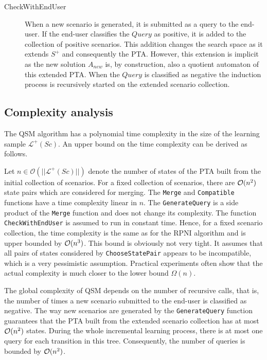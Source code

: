 \begin{description}
\item[CheckWithEndUser] When a new scenario is generated, it is submitted as a query to the end-user. If the end-user classifies the $Query$ as positive, it is added to the collection of positive scenarios. This addition changes the search space as it extends $S^+$ and consequently the PTA. However, this extension is implicit as the new solution $A_{new}$ is, by construction, also a quotient automaton of this extended PTA. When the $Query$ is classified as negative the induction process is recursively started on the extended scenario collection.

\end{description}

\subsection{Complexity analysis}

The QSM algorithm has a polynomial time complexity in the size of the learning sample $\mathcal{L}^+(Sc)$. An upper bound on the time complexity can be derived as follows.

Let $n\in \mathcal{O}(|| \mathcal{L}^+(Sc) ||)$ denote the number of states of the PTA built from the initial collection of scenarios. For a fixed collection of scenarios, there are ${\cal O}(n^2)$ state pairs which are considered for merging. The \texttt{Merge} and \texttt{Compatible} functions have a time complexity linear in $n$. The \texttt{GenerateQuery} is a side product of the \texttt{Merge} function and does not change its complexity. The function \texttt{CheckWithEndUser} is assumed to run in constant time. Hence, for a fixed scenario collection, the time complexity is the same as for the RPNI algorithm and is upper bounded by ${\cal O}(n^3)$. This bound is obviously not very tight. It assumes that all pairs of states considered by \texttt{ChooseStatePair} appears to be incompatible, which is a very pessimistic assumption. Practical experiments often show that the actual complexity is much closer to the lower bound $\Omega(n)$. 

The global complexity of QSM depends on the number of recursive calls, that is, the number of times a new scenario submitted to the end-user is classified as negative. The way new scenarios are generated by the \texttt{GenerateQuery} function guarantees that the PTA built from the extended scenario collection has at most ${\cal O}(n^2)$ states. During the whole incremental learning process, there is at most one query for each transition in this tree. Consequently, the number of queries is bounded by ${\cal O}(n^2)$.

